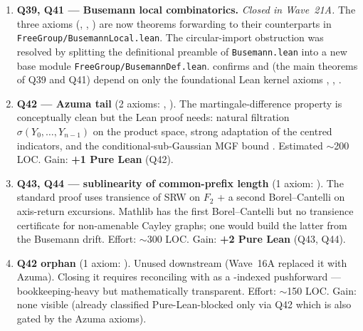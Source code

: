 \documentclass[11pt,a4paper]{article}
\newcommand{\lmod}[1]{\texttt{\small #1}}
\theoremstyle{plain}
\theoremstyle{definition}
\begin{document}
\begin{enumerate}[leftmargin=1.3em]

\item \textbf{Q39, Q41 --- Busemann local combinatorics.}
      \emph{Closed in Wave~21A.} The three axioms
      (,
      ,
      ) are now theorems
      forwarding to their  counterparts in
      \lmod{FreeGroup/BusemannLocal.lean}. The circular-import
      obstruction was resolved by splitting the definitional
      preamble of \lmod{Busemann.lean} into a new base module
      \lmod{FreeGroup/BusemannDef.lean}. 
      confirms  and
       (the
      main theorems of Q39 and Q41) depend on only the foundational
      Lean kernel axioms , ,
      .

\item \textbf{Q42 --- Azuma tail}
      (2 axioms: ,
      ).
      The martingale-difference property is conceptually clean but
      the Lean proof needs: natural filtration
      $\sigma(Y_0, \dots, Y_{n-1})$ on the product space, strong
      adaptation of the centred indicators, and the
      conditional-sub-Gaussian MGF bound
      . Estimated $\sim$200 LOC. Gain:
      \textbf{+1 Pure Lean} (Q42).

\item \textbf{Q43, Q44 --- sublinearity of common-prefix length}
      (1 axiom: ). The standard
      proof uses transience of SRW on $F_2$ + a second
      Borel--Cantelli on axis-return excursions. Mathlib has the
      first Borel--Cantelli but no transience certificate for
      non-amenable Cayley graphs; one would build the latter from
      the Busemann drift. Effort: $\sim$300 LOC. Gain:
      \textbf{+2 Pure Lean} (Q43, Q44).

\item \textbf{Q42 orphan}
      (1 axiom: ). Unused
      downstream (Wave~16A replaced it with Azuma). Closing it
      requires reconciling  with
       as a -indexed
      pushforward --- bookkeeping-heavy but mathematically
      transparent. Effort: $\sim$150 LOC. Gain: none visible
      (already classified Pure-Lean-blocked only via Q42 which is
      also gated by the Azuma axioms).


\end{enumerate}
\end{document}
